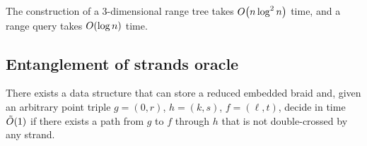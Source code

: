 \documentclass[a4paper,11pt]{article}
\begin{document}
\begin{remark}
	The construction of a 3-dimensional range tree takes \(O \lr*{n \log^2 n}\) time,
	and a range query takes \(O \lr*{\log n}\) time.
\end{remark}


\subsection{Entanglement of strands oracle}

\begin{theorem} \label{thm:entgstrands}
	There exists a data structure that can store a reduced embedded braid \braid and,
	given an arbitrary point triple \(g = (0,r)\), \(h = (k,s)\), \(f = (\ell,t)\),
	decide in time \(\Ot\lr*{1}\) if there exists a path from \(g\) to \(f\)
	through \(h\) that is not double-crossed by any strand.
\end{theorem}
\end{document}
